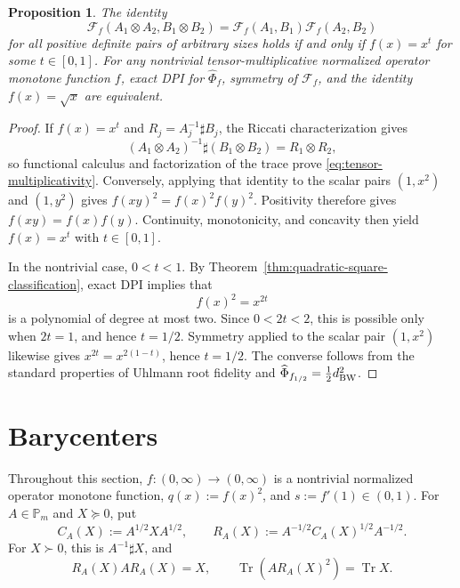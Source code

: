\documentclass[11pt]{amsart}
\newtheorem{proposition}[theorem]{Proposition}
\theoremstyle{definition}
\theoremstyle{remark}
\newcommand{\Pm}{\mathbb P_m}
\newcommand{\Tr}{\operatorname{Tr}}
\newcommand{\altPhi}{\widehat{\Phi}}
\begin{document}
	\begin{proposition}
		\label{prop:tensor-rigidity}
		The identity
		\begin{equation}\label{eq:tensor-multiplicativity}
			\mathcal F_f(A_1\otimes A_2,B_1\otimes B_2)
			=\mathcal F_f(A_1,B_1)\mathcal F_f(A_2,B_2)
		\end{equation}
		for all positive definite pairs of arbitrary sizes holds if and only if
			$f(x)=x^t$ for some $t\in[0,1]$.  For any nontrivial tensor-multiplicative normalized operator monotone
			function $f$, exact DPI for $\altPhi_f$, symmetry of $\mathcal F_f$,
			and the identity $f(x)=\sqrt{x}$ are equivalent.
	\end{proposition}

	\begin{proof}
		If $f(x)=x^t$ and $R_j=A_j^{-1}\sharp B_j$, the Riccati
		characterization gives
		\[
		(A_1\otimes A_2)^{-1}\sharp(B_1\otimes B_2)=R_1\otimes R_2,
		\]
		so functional calculus and factorization of the trace prove
		\eqref{eq:tensor-multiplicativity}.  Conversely, applying that identity
		to the scalar pairs $(1,x^2)$ and $(1,y^2)$ gives
		$f(xy)^2=f(x)^2f(y)^2$.  Positivity therefore gives
		$f(xy)=f(x)f(y)$.  Continuity, monotonicity, and concavity then yield
		$f(x)=x^t$ with $t\in[0,1]$.

		In the nontrivial case, $0<t<1$. By
		Theorem~\ref{thm:quadratic-square-classification}, exact DPI implies that
		\[
		f(x)^2=x^{2t}
		\]
		is a polynomial of degree at most two. Since $0<2t<2$, this is possible
		only when $2t=1$, and hence $t=1/2$.
		Symmetry applied to the scalar pair $(1,x^2)$ likewise gives
		$x^{2t}=x^{2(1-t)}$, hence $t=1/2$.  The converse follows from the
		standard properties of Uhlmann root fidelity and
		$\altPhi_{f_{1/2}}=\tfrac12d_{\rm BW}^2$.
	\end{proof}

	\section{Barycenters}
	\label{sec:barycenters}
	
Throughout this section,
	$f:(0,\infty)\to(0,\infty)$ is a nontrivial normalized operator
	monotone function, $q(x):=f(x)^2$, and
	$s:=f'(1)\in(0,1)$.  For $A\in\Pm$ and
	$X\succeq0$, put
	\begin{equation}\label{eq:RA}
		C_A(X):=A^{1/2}XA^{1/2},
		\qquad
		R_A(X):=A^{-1/2}C_A(X)^{1/2}A^{-1/2}.
	\end{equation}
	For $X\succ0$, this is $A^{-1}\sharp X$, and
	\begin{equation}\label{eq:RA-properties}
		R_A(X)AR_A(X)=X,
		\qquad
		\Tr\!\left(AR_A(X)^2\right)=\Tr X.
	\end{equation}
	
\end{document}
